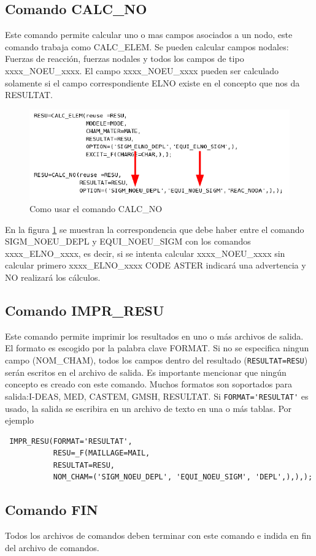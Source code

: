 \documentclass[12pt]{book}
\theoremstyle{definition}
\theoremstyle{remark}
\theoremstyle{plain}
\begin{document}
\subsection{Comando CALC\_NO}
Este comando permite calcular uno o mas campos asociados a un nodo, este comando
trabaja como CALC\_ELEM. Se pueden calcular campos nodales: Fuerzas de reacción, fuerzas
nodales y todos los campos de tipo xxxx\_NOEU\_xxxx. El campo xxxx\_NOEU\_xxxx pueden
ser calculado solamente si el campo correspondiente ELNO existe en el concepto 
que nos da RESULTAT.

\begin{figure}
\centering
\includegraphics[width=5in]{CALC_NO.png}
\caption{Como usar el comando CALC\_NO}
\label{fig8}
\end{figure}
En la figura \ref{fig8} se muestran la correspondencia que debe haber entre el comando
SIGM\_NOEU\_DEPL y EQUI\_NOEU\_SIGM con los comandos xxxx\_ELNO\_xxxx, es decir, 
si se  intenta calcular xxxx\_NOEU\_xxxx sin calcular primero  xxxx\_ELNO\_xxxx 
CODE ASTER indicará una advertencia y NO realizará los cálculos. 

\subsection{Comando IMPR\_RESU}

Este comando permite imprimir los resultados en uno o más archivos de salida. El 
formato es escogido por la palabra clave FORMAT. Si no se especifica ningun campo
(NOM\_CHAM), todos los campos dentro del resultado (\verb|RESULTAT=RESU|) serán escritos
en el archivo de salida. Es importante mencionar que ningún concepto es creado
con este comando. Muchos formatos son soportados para salida:I-DEAS, MED, CASTEM, GMSH, RESULTAT. Si \verb|FORMAT='RESULTAT'| es usado, la salida se escribira en un
archivo de texto en una o más tablas. Por ejemplo


\begin{verbatim}
 IMPR_RESU(FORMAT='RESULTAT',
           RESU=_F(MAILLAGE=MAIL,
           RESULTAT=RESU,
           NOM_CHAM=('SIGM_NOEU_DEPL', 'EQUI_NOEU_SIGM', 'DEPL',),),);
\end{verbatim} 

\subsection{Comando FIN}

Todos los archivos de comandos deben terminar con este comando e indida en fin 
del archivo de comandos.

\backmatter
\end{document}

